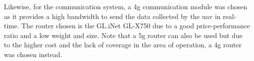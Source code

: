 Likewise, for the communication system, a \gls{4g} communication module was chosen as it provides a high bandwidth to send the data collected by the \gls{uav} in real-time. The router chosen is the GL.iNet GL-X750 \autocite{glinetGLX750Spitz} due to a good price-performance ratio and a low weight and size. Note that a \gls{5g} router can also be used but due to the higher cost and the lack of coverage in the area of operation, a \gls{4g} router was chosen instead.

